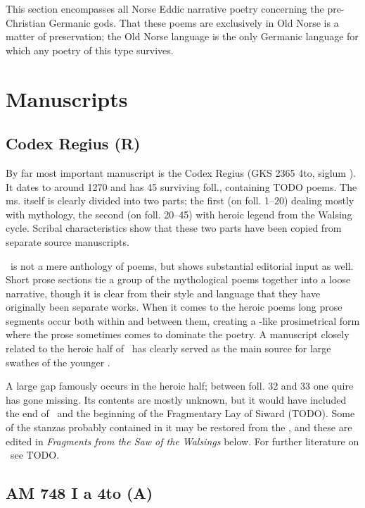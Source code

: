 
This section encompasses all Norse Eddic narrative poetry concerning the pre-Christian Germanic gods.  That these poems are exclusively in Old Norse is a matter of preservation; the Old Norse language is the only Germanic language for which any poetry of this type survives.

\section{Manuscripts}

\subsection{Codex Regius (R)}

By far most important manuscript is the Codex Regius (GKS 2365 4to, siglum \Regius).  It dates to around 1270 and has 45 surviving foll., containing TODO poems.  The ms. itself is clearly divided into two parts; the first (on foll. 1–20) dealing mostly with mythology, the second (on foll. 20–45) with heroic legend from the Walsing cycle.  Scribal characteristics show that these two parts have been copied from separate source manuscripts.

\Regius\ is not a mere anthology of poems, but shows substantial editorial input as well.  Short prose sections tie a group of the mythological poems together into a loose narrative, though it is clear from their style and language that they have originally been separate works.  When it comes to the heroic poems long prose segments occur both within and between them, creating a -like prosimetrical form where the prose sometimes comes to dominate the poetry.  A manuscript closely related to the heroic half of \Regius\ has clearly served as the main source for large swathes of the younger \VolsungaSaga.

A large gap famously occurs in the heroic half; between foll. 32 and 33 one quire has gone missing.  Its contents are mostly unknown, but it would have included the end of \Sigrdrifumal\ and the beginning of the Fragmentary Lay of Siward (TODO).  Some of the stanzas probably contained in it may be restored from the \VolsungaSaga, and these are edited in \emph{Fragments from the Saw of the Walsings} below.  For further literature on \Regius\ see TODO.

\subsection{AM 748 I a 4to (A)}

